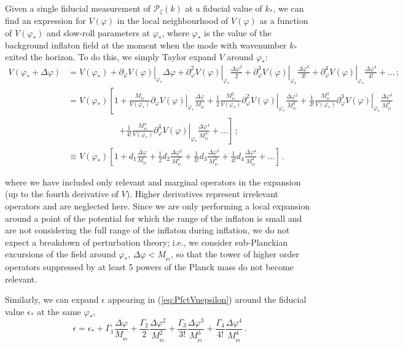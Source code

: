 \documentclass[prd, onecolumn, floatfix, letterpaper, nofootinbib, amsmath, amssymb, superscriptaddress]{revtex4}
\renewcommand{\(}{\left(}
\renewcommand{\)}{\right)}
\renewcommand{\[}{\left[}
\renewcommand{\]}{\right]}
\def\be{\begin{equation}}
\def\ee{\end{equation}}
\newcommand{\Mp}{M_{_\mathrm{Pl}}}
\begin{document}
Given a single fiducial measurement of $\mathcal{P}_\zeta(k)$ at a fiducial value of $k_*$, we can find an expression for $V(\varphi)$ in the local neighbourhood of $V(\varphi)$ as a function of $V(\varphi_*)$ and slow-roll parameters at $\varphi_*$, where $\varphi_*$ is the value of the background inflaton field at the moment when the mode with wavenumber $k_*$ exited the horizon. To do this, we simply Taylor expand $V$ around $\varphi_*$:
\begin{align}
	V(\varphi_*+\Delta\varphi)&=V(\varphi_*)+\left.\partial_\varphi V(\varphi)\right|_{\varphi_*}\Delta\varphi+\left.\partial^2_\varphi V(\varphi)\right|_{\varphi_*}\frac{\Delta\varphi^2}{2}+\left.\partial^3_\varphi V(\varphi)\right|_{\varphi_*}\frac{\Delta\varphi^3}{3!}+\left.\partial^4_\varphi V(\varphi)\right|_{\varphi_*}\frac{\Delta\varphi^4}{4!}+...\, ;\\
	&=V(\varphi_*)\left[1+\frac{\Mp}{V(\varphi_*)}\left.\partial_\varphi V(\varphi)\right|_{\varphi_*}\frac{\Delta\varphi}{\Mp}+\frac{1}{2}\frac{\Mp^2}{V(\varphi_*)}\left.\partial^2_\varphi V(\varphi)\right|_{\varphi_*}\frac{\Delta\varphi^2}{\Mp^2}+\frac{1}{3!}\frac{\Mp^3}{V(\varphi_*)}\left.\partial^3_\varphi V(\varphi)\right|_{\varphi_*}\frac{\Delta\varphi^3}{\Mp^3}\right. \nonumber\\
	&\qquad\qquad\qquad\left.+\frac{1}{4!}\frac{\Mp^4}{V(\varphi_*)}\left.\partial^4_\varphi V(\varphi)\right|_{\varphi_*}\frac{\Delta\varphi^4}{\Mp^4}+...\right]\, ;\\
	&\equiv V(\varphi_*)\left[1+d_1\frac{\Delta\varphi}{\Mp}+\frac{1}{2}d_2\frac{\Delta\varphi^2}{\Mp^2}+\frac{1}{3!}d_3\frac{\Delta\varphi^3}{\Mp^3} +\frac{1}{4!}d_4\frac{\Delta\varphi^4}{\Mp^4}+...\right]\,.
\end{align}

where we have included only relevant and marginal operators in the expansion (up to the fourth derivative of $V$). Higher derivatives represent irrelevant operators and are neglected here. Since we are only performing a local expansion around a point of the potential for which the range of the inflaton is small and are not considering the full range of the inflaton during inflation, we do not expect a breakdown of perturbation theory; i.e., we consider sub-Planckian excursions of the field around $\varphi_*$, $\Delta\varphi<\Mp$, so that the tower of higher order operators suppressed by at least 5 powers of the Planck mass do not become relevant.

Similarly, we can expand $\epsilon$ appearing in (\ref{eq:PfctVnepsilon}) around the fiducial value $\epsilon_*$ at the same $\varphi_*$,
\be
	\epsilon=\epsilon_*+\Gamma_1\frac{\Delta\varphi}{\Mp}+\frac{\Gamma_2}{2}\frac{\Delta\varphi^2}{\Mp^2}+\frac{\Gamma_3}{3!}\frac{\Delta\varphi^3}{\Mp^3}+\frac{\Gamma_4}{4!}\frac{\Delta\varphi^4}{\Mp^4}\, .
\ee
 
\end{document}

